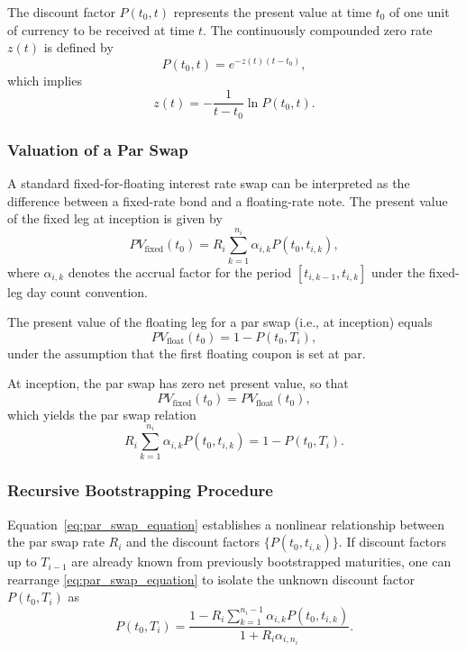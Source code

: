 The discount factor $P(t_0, t)$ represents the present value at time $t_0$ of one unit of currency to be received at time $t$. The continuously compounded zero rate $z(t)$ is defined by
\begin{equation}
    P(t_0, t) = e^{-z(t)(t - t_0)},
    \label{eq:discount_zero_relation}
\end{equation}
which implies
\begin{equation}
    z(t) = -\frac{1}{t - t_0} \ln P(t_0, t).
    \label{eq:zero_rate_definition}
\end{equation}

\subsubsection{Valuation of a Par Swap}
A standard fixed-for-floating interest rate swap can be interpreted as the difference between a fixed-rate bond and a floating-rate note. The present value of the fixed leg at inception is given by
\begin{equation}
    PV_{\text{fixed}}(t_0) = R_i \sum_{k=1}^{n_i} \alpha_{i,k} P(t_0, t_{i,k}),
    \label{eq:fixed_leg_pv}
\end{equation}
where $\alpha_{i,k}$ denotes the accrual factor for the period $[t_{i,k-1}, t_{i,k}]$ under the fixed-leg day count convention.

The present value of the floating leg for a par swap (i.e., at inception) equals
\begin{equation}
    PV_{\text{float}}(t_0) = 1 - P(t_0, T_i),
    \label{eq:float_leg_pv}
\end{equation}
under the assumption that the first floating coupon is set at par.

At inception, the par swap has zero net present value, so that
\begin{equation}
    PV_{\text{fixed}}(t_0) = PV_{\text{float}}(t_0),
    \label{eq:par_swap_condition}
\end{equation}
which yields the par swap relation
\begin{equation}
    R_i \sum_{k=1}^{n_i} \alpha_{i,k} P(t_0, t_{i,k}) = 1 - P(t_0, T_i).
    \label{eq:par_swap_equation}
\end{equation}

\subsubsection{Recursive Bootstrapping Procedure}
Equation~\eqref{eq:par_swap_equation} establishes a nonlinear relationship between the par swap rate $R_i$ and the discount factors $\{P(t_0, t_{i,k})\}$. If discount factors up to $T_{i-1}$ are already known from previously bootstrapped maturities, one can rearrange \eqref{eq:par_swap_equation} to isolate the unknown discount factor $P(t_0, T_i)$ as
\begin{equation}
    P(t_0, T_i) = \frac{1 - R_i \sum_{k=1}^{n_i - 1} \alpha_{i,k} P(t_0, t_{i,k})}
    {1 + R_i \alpha_{i,n_i}}.
    \label{eq:bootstrap_equation}
\end{equation}

